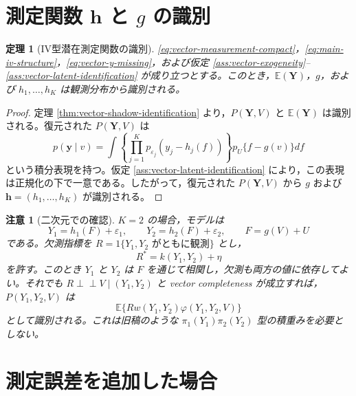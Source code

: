 \documentclass[dvipdfmx,autodetect-engine]{jsarticle}
\newtheorem{theorem}{定理}
\newtheorem{remark}{注意}
\newcommand{\indep}{\mathrel{\perp\!\!\!\perp}}
\newcommand{\E}{\mathbb{E}}
\newcommand{\1}{\mathbf{1}}
\newcommand{\Y}{\bm{Y}}
\begin{document}
\section{測定関数 $\bm h$ と $g$ の識別}

\begin{theorem}[IV型潜在測定関数の識別]
\label{thm:vector-iv-functions}
\eqref{eq:vector-measurement-compact}，\eqref{eq:main-iv-structure}，\eqref{eq:vector-y-missing}，および仮定 \ref{ass:vector-exogeneity}--\ref{ass:vector-latent-identification} が成り立つとする。このとき，$\E(\Y)$，$g$，および $h_1,\ldots,h_K$ は観測分布から識別される。
\end{theorem}

\begin{proof}
定理 \ref{thm:vector-shadow-identification} より，$P(\Y,V)$ と $\E(\Y)$ は識別される。復元された $P(\Y,V)$ は
\begin{equation}
  p(\bm y\mid v)
  =\int
    \left\{\prod_{j=1}^K p_{\varepsilon_j}(y_j-h_j(f))\right\}
    p_U\{f-g(v)\}
    df
  \label{eq:vector-iv-kernel}
\end{equation}
という積分表現を持つ。仮定 \ref{ass:vector-latent-identification} により，この表現は正規化の下で一意である。したがって，復元された $P(\Y,V)$ から $g$ および $\bm h=(h_1,\ldots,h_K)$ が識別される。
\end{proof}

\begin{remark}[二次元での確認]
$K=2$ の場合，モデルは
\begin{equation}
  Y_1=h_1(F)+\varepsilon_1,
  \qquad
  Y_2=h_2(F)+\varepsilon_2,
  \qquad
  F=g(V)+U
\end{equation}
である。欠測指標を $R=1\{Y_1,Y_2\text{ がともに観測}\}$ とし，
\begin{equation}
  R^*=k(Y_1,Y_2)+\eta
\end{equation}
を許す。このとき $Y_1$ と $Y_2$ は $F$ を通じて相関し，欠測も両方の値に依存してよい。それでも $R\indep V\mid (Y_1,Y_2)$ と vector completeness が成立すれば，$P(Y_1,Y_2,V)$ は
\begin{equation}
  \E\{Rw(Y_1,Y_2)\varphi(Y_1,Y_2,V)\}
\end{equation}
として識別される。これは旧稿のような $\pi_1(Y_1)\pi_2(Y_2)$ 型の積重みを必要としない。
\end{remark}

\section{測定誤差を追加した場合}
\end{document}
